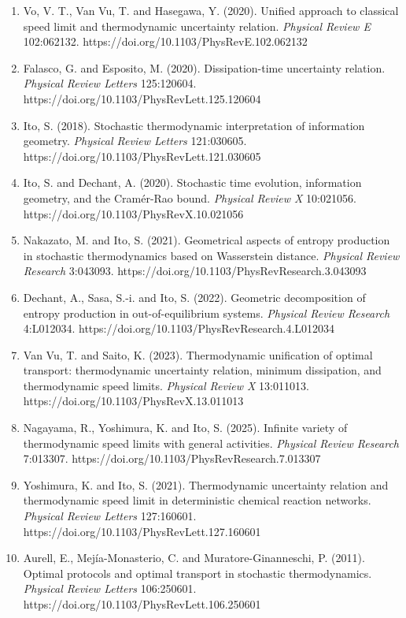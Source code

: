 \documentclass[
  10pt,
]{article}
\begin{document}
\begin{enumerate}
\item
  Vo, V. T., Van Vu, T. and Hasegawa, Y. (2020). Unified approach to
  classical speed limit and thermodynamic uncertainty relation.
  \emph{Physical Review E} 102:062132.
  https://doi.org/10.1103/PhysRevE.102.062132
\item
  Falasco, G. and Esposito, M. (2020). Dissipation-time uncertainty
  relation. \emph{Physical Review Letters} 125:120604.
  https://doi.org/10.1103/PhysRevLett.125.120604
\item
  Ito, S. (2018). Stochastic thermodynamic interpretation of information
  geometry. \emph{Physical Review Letters} 121:030605.
  https://doi.org/10.1103/PhysRevLett.121.030605
\item
  Ito, S. and Dechant, A. (2020). Stochastic time evolution, information
  geometry, and the Cramér-Rao bound. \emph{Physical Review X}
  10:021056. https://doi.org/10.1103/PhysRevX.10.021056
\item
  Nakazato, M. and Ito, S. (2021). Geometrical aspects of entropy
  production in stochastic thermodynamics based on Wasserstein distance.
  \emph{Physical Review Research} 3:043093.
  https://doi.org/10.1103/PhysRevResearch.3.043093
\item
  Dechant, A., Sasa, S.-i. and Ito, S. (2022). Geometric decomposition
  of entropy production in out-of-equilibrium systems. \emph{Physical
  Review Research} 4:L012034.
  https://doi.org/10.1103/PhysRevResearch.4.L012034
\item
  Van Vu, T. and Saito, K. (2023). Thermodynamic unification of optimal
  transport: thermodynamic uncertainty relation, minimum dissipation,
  and thermodynamic speed limits. \emph{Physical Review X} 13:011013.
  https://doi.org/10.1103/PhysRevX.13.011013
\item
  Nagayama, R., Yoshimura, K. and Ito, S. (2025). Infinite variety of
  thermodynamic speed limits with general activities. \emph{Physical
  Review Research} 7:013307.
  https://doi.org/10.1103/PhysRevResearch.7.013307
\item
  Yoshimura, K. and Ito, S. (2021). Thermodynamic uncertainty relation
  and thermodynamic speed limit in deterministic chemical reaction
  networks. \emph{Physical Review Letters} 127:160601.
  https://doi.org/10.1103/PhysRevLett.127.160601
\item
  Aurell, E., Mejía-Monasterio, C. and Muratore-Ginanneschi, P. (2011).
  Optimal protocols and optimal transport in stochastic thermodynamics.
  \emph{Physical Review Letters} 106:250601.
  https://doi.org/10.1103/PhysRevLett.106.250601

\end{enumerate}
\end{document}
